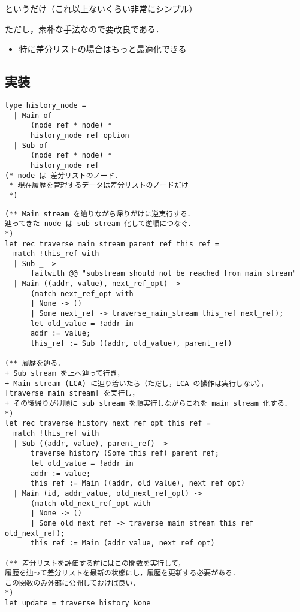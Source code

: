 \documentclass[10pt, a4j, twocolumn]{scrartcl}
\begin{document}
というだけ（これ以上ないくらい非常にシンプル）

ただし，素朴な手法なので要改良である．
\begin{itemize}
\item 特に差分リストの場合はもっと最適化できる
\end{itemize}


\subsection{実装}
\label{sec:org6c6cc15}

\begin{lstlisting}
type history_node =
  | Main of
      (node ref * node) *
      history_node ref option
  | Sub of
      (node ref * node) *
      history_node ref
(* node は 差分リストのノード．
 * 現在履歴を管理するデータは差分リストのノードだけ
 *)
\end{lstlisting}


\begin{lstlisting}
(** Main stream を辿りながら帰りがけに逆実行する．
辿ってきた node は sub stream 化して逆順につなぐ．
*)
let rec traverse_main_stream parent_ref this_ref =
  match !this_ref with
  | Sub _ -> 
      failwith @@ "substream should not be reached from main stream"
  | Main ((addr, value), next_ref_opt) ->
      (match next_ref_opt with
      | None -> ()
      | Some next_ref -> traverse_main_stream this_ref next_ref);
      let old_value = !addr in
      addr := value;
      this_ref := Sub ((addr, old_value), parent_ref)

(** 履歴を辿る．
+ Sub stream を上へ辿って行き，
+ Main stream (LCA) に辿り着いたら（ただし，LCA の操作は実行しない），[traverse_main_stream] を実行し，
+ その後帰りがけ順に sub stream を順実行しながらこれを main stream 化する．
*)
let rec traverse_history next_ref_opt this_ref =
  match !this_ref with
  | Sub ((addr, value), parent_ref) ->
      traverse_history (Some this_ref) parent_ref;
      let old_value = !addr in
      addr := value;
      this_ref := Main ((addr, old_value), next_ref_opt)
  | Main (id, addr_value, old_next_ref_opt) ->
      (match old_next_ref_opt with
      | None -> ()
      | Some old_next_ref -> traverse_main_stream this_ref old_next_ref);
      this_ref := Main (addr_value, next_ref_opt)

(** 差分リストを評価する前にはこの関数を実行して，
履歴を辿って差分リストを最新の状態にし，履歴を更新する必要がある．
この関数のみ外部に公開しておけば良い．
*)
let update = traverse_history None
\end{lstlisting}
\end{document}
